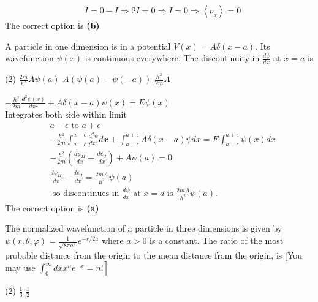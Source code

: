 \begin{enumerate}
\begin{answer}
\begin{align*}
	&I=0-I \Rightarrow 2 I=0 \Rightarrow I=0 \Rightarrow\left\langle p_{x}\right\rangle=0
	\end{align*}
	The correct option is \textbf{(b)}
\end{answer}
\begin{minipage}{\textwidth}
	\item A particle in one dimension is in a potential $V(x)=A \delta(x-a)$. Its wavefunction $\psi(x)$ is continuous everywhere. The discontinuity in $\frac{d \psi}{d x}$ at $x=a$ is
\end{minipage}
\begin{tasks}(2)
	\task[\textbf{A.}] $\frac{2 m}{\hbar^{2}} A \psi(a)$
	\task[\textbf{B.}]$A(\psi(a)-\psi(-a))$
	\task[\textbf{C.}]$\frac{\hbar^{2}}{2 m} A$
\end{tasks}
\begin{answer}
	$-\frac{\hbar^{2}}{2 m} \frac{d^{2} \psi(x)}{d x^{2}}+A \delta(x-a) \psi(x)=E \psi(x)$\\
	Integrates both side within limit
	\begin{align*}
	&a-\epsilon \text { to } a+\epsilon \\
	&-\frac{\hbar^{2}}{2 m} \int_{a-\epsilon}^{a+\epsilon} \frac{d^{2} \psi}{d x^{2}} d x+\int_{a-\epsilon}^{a+\epsilon} A \delta(x-a) \psi d x=E \int_{a-\epsilon}^{a+\epsilon} \psi(x) d x \\
	&-\frac{\hbar^{2}}{2 m}\left(\frac{d \psi_{I I}}{d x}-\frac{d \psi_{I}}{d x}\right)+A \psi(a)=0 \\
	&\frac{d \psi_{I I}}{d x}-\frac{d \psi_{I}}{d x}=\frac{2 m A}{\hbar^{2}} \psi(a) \\
	&\text { so discontinues in } \frac{d \psi}{d x} \text { at } x=a \text { is } \frac{2 m A}{\hbar^{2}} \psi(a) .
	\end{align*}
	The correct option is \textbf{(a)}
\end{answer}
\begin{minipage}{\textwidth}
	\item The normalized wavefunction of a particle in three dimensions is given by $\psi(r, \theta, \varphi)=\frac{1}{\sqrt{8 \pi a^{3}}} e^{-r / 2 a}$ where $a>0$ is a constant. The ratio of the most probable distance from the origin to the mean distance from the origin, is
	[You may use $\left.\int_{0}^{\infty} d x x^{n} e^{-x}=n !\right]$
\end{minipage}
\begin{tasks}(2)
	\task[\textbf{A.}] $\frac{1}{3}$
	\task[\textbf{B.}]$\frac{1}{2}$

\end{tasks}
\end{enumerate}

